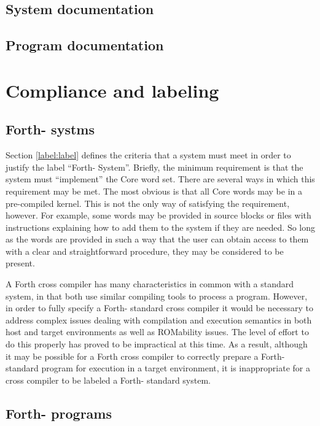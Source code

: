 \subsection{System documentation} %

\subsection{Program documentation} %

\section{Compliance and labeling} %

\subsection{Forth-\snapshot{} systms} %

Section \ref{label:label} defines the criteria that a system must
meet in order to justify the label ``Forth-\snapshot{} System''. Briefly,
the minimum requirement is that the system must ``implement'' the
Core word set. There are several ways in which this requirement may
be met. The most obvious is that all Core words may be in a pre-compiled
kernel. This is not the only way of satisfying the requirement,
however. For example, some words may be provided in source blocks or
files with instructions explaining how to add them to the system if
they are needed. So long as the words are provided in such a way that
the user can obtain access to them with a clear and straightforward
procedure, they may be considered to be present.

A Forth cross compiler has many characteristics in common with a standard
system, in that both use similar compiling tools to process a program.
However, in order to fully specify a Forth-\snapshot{} standard
cross compiler it would be necessary to address complex issues dealing with
compilation
and execution semantics in both host and target environments as well as
ROMability issues. The level of effort to do this properly has proved to
be impractical at this time. As a result, although it may be possible
for a Forth cross compiler to correctly prepare a Forth-\snapshot{}
standard program for execution in a target environment, it is inappropriate
for a cross compiler to be labeled a Forth-\snapshot{} standard system.

\subsection{Forth-\snapshot{} programs} %

